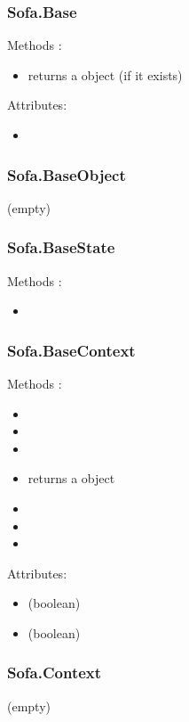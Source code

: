 \subsubsection{Sofa.Base}
Methods :
\begin{itemize}
\item {} returns a  object (if it exists)
\end{itemize}
Attributes:
\begin{itemize}
\item {} 
\end{itemize}

\subsubsection{Sofa.BaseObject}
(empty)

\subsubsection{Sofa.BaseState}
Methods :
\begin{itemize}
\item {}
\end{itemize}

\subsubsection{Sofa.BaseContext}
Methods :
\begin{itemize}
\item {} 
\item {} 
\item {} 
\item {} returns a  object
\item {} 
\item {}
\item {}
\end{itemize}
Attributes:
\begin{itemize}
\item {}  (boolean)
\item {}  (boolean)
\end{itemize}


\subsubsection{Sofa.Context}
(empty)
